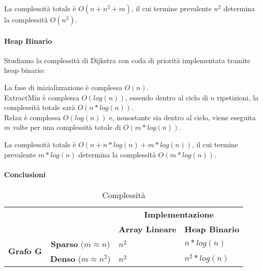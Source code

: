 La complessità totale è $O(n+n^2+m)$, il cui termine prevalente $n^2$ determina la complessità $O(n^2)$.

\paragraph{Heap Binario}

{Studiamo la complessità di Dijkstra con coda di priorità implementata tramite heap binario:}

La fase di inizializzazione è complessa $O(n)$. \\
ExtractMin è complessa $O(log(n))$, essendo dentro al ciclo di $n$ ripetizioni, la complessità totale sarà $O(n*log(n))$. \\
Relax è complessa $O(log(n))$ e, nonostante sia dentro al ciclo, viene eseguita $m$ volte per una complessità totale di $O(m*log(n))$.

La complessità totale è $O(n+n*log(n)+m*log(n))$, il cui termine prevalente $m*log(n)$ determina la complessità $O(m*log(n))$.

\paragraph{Conclusioni}

\begin{table}[h]
\centering
\caption{Complessità}
\begin{tabular}{ll|l|l|}
\cline{3-4}
                                                        &                                      & \multicolumn{2}{c|}{\textbf{Implementazione}}                                            \\ \cline{3-4}
                                                        &                                      & \multicolumn{1}{c|}{\textbf{Array Lineare}} & \multicolumn{1}{c|}{\textbf{Heap Binario}} \\ \hline
\multicolumn{1}{|c|}{\multirow{2}{*}{\textbf{Grafo G}}} & \multicolumn{1}{c|}{\textbf{Sparso} ($m \approx n$)} & $n^2$                                         & $n*log(n)$                                        \\ \cline{2-4}
\multicolumn{1}{|c|}{}                                  & \multicolumn{1}{c|}{\textbf{Denso}  ($m \approx n^2$)}  & $n^2$                                         & $n^2*log(n)$                                                                               \\ \hline
\end{tabular}
\end{table}

